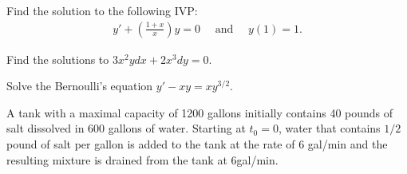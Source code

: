 \documentclass[addpoints, 12pt]{exam}%
\newcommand{\op}{\left(}
\newcommand{\fp}{\right)}
\newcommand{\ra}{\rightarrow}
\theoremstyle{definition}
\begin{document}

\vspace*{0.5cm}

\newpage

\begin{questions}

\question[20]
Find the solution to the following IVP:
	\begin{align*}
	y' + \op \frac{1 + x}{x} \fp y = 0 \quad \text{ and } \quad y(1) = 1 .
	\end{align*}
	
\newpage
	
\question[20]

Find the solutions to $3x^2 y dx + 2x^3 dy = 0$.
	
\newpage
	
\question[20]

Solve the Bernoulli's equation $\displaystyle y' - xy = xy^{3/2}$.
	
	
\newpage

\question
A tank with a maximal capacity of 1200 gallons initially contains 40 pounds of salt dissolved in 600 gallons of water. Starting at $t_0 = 0$, water that contains $1/2$ pound of salt per gallon is added to the tank at the rate of $6$ gal/min and the resulting mixture is drained from the tank at $6$gal/min. 


\end{questions}
\end{document}
